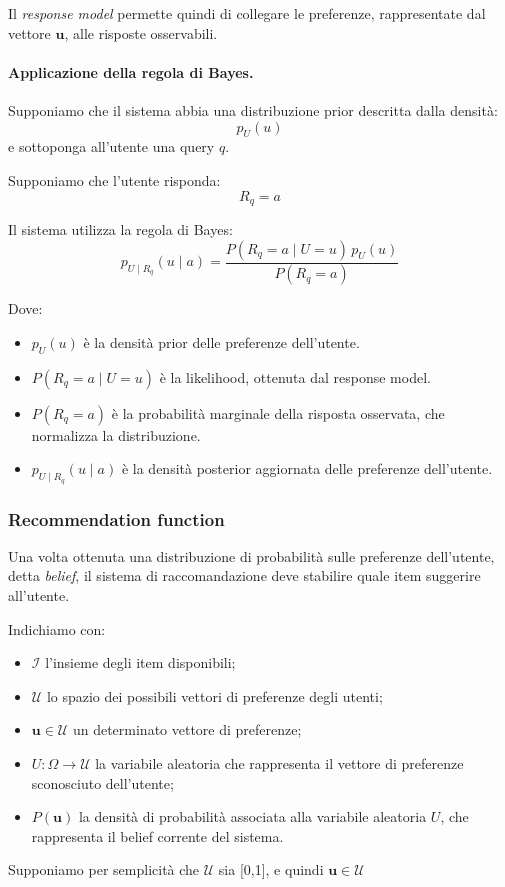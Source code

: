 Il \textit{response model} permette quindi di collegare le preferenze, rappresentate dal vettore $\mathbf{u}$, alle risposte osservabili.

\paragraph{Applicazione della regola di Bayes.}

Supponiamo che il sistema abbia una distribuzione prior descritta dalla densità:
\[
p_U(u)
\]
e sottoponga all'utente una query $q$.

Supponiamo che l'utente risponda:
\[
R_q=a
\]

Il sistema utilizza la regola di Bayes:
\[
\boxed{
p_{U\mid R_q}(u\mid a)
=
\frac{
P(R_q=a\mid U=u)\,p_U(u)
}{
P(R_q=a)
}
}
\]

Dove:
\begin{itemize}
    \item \(p_U(u)\) è la densità prior delle preferenze dell'utente.
    \item \(P(R_q=a\mid U=u)\) è la likelihood, ottenuta dal response model.
    \item \(P(R_q=a)\) è la probabilità marginale della risposta osservata, che normalizza la distribuzione.
    \item \(p_{U\mid R_q}(u\mid a)\) è la densità posterior aggiornata delle preferenze dell'utente.
\end{itemize}

\newpage



\subsubsection{Recommendation function}

Una volta ottenuta una distribuzione di probabilità sulle preferenze
dell'utente, detta \textit{belief}, il sistema di raccomandazione deve
stabilire quale item suggerire all'utente.

Indichiamo con:
\begin{itemize}
    \item $\mathcal I$ l'insieme degli item disponibili;
    \item $\mathcal U$ lo spazio dei possibili vettori di preferenze degli utenti;
    \item $\mathbf u\in\mathcal U$ un determinato vettore di preferenze;
    \item $U:\Omega\rightarrow\mathcal U$ la variabile aleatoria che rappresenta
    il vettore di preferenze sconosciuto dell'utente;
    \item $P(\mathbf u)$ la densità di probabilità associata alla variabile
    aleatoria $U$, che rappresenta il belief corrente del sistema.
\end{itemize}
Supponiamo per semplicità che $\mathcal{U}$ sia [0,1], e quindi $\mathbf u \in \mathcal{U}$


